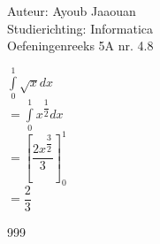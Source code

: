 \documentclass[a4paper]{article}
\newcommand{\dint}{\displaystyle\int}
\begin{document}
\noindent \large Auteur: Ayoub Jaaouan \\
\noindent \large Studierichting: Informatica\\
\noindent \large Oefeningenreeks 5A nr. 4.8\\

\medskip

\normalsize

$ \dint\limits_{0}^{1} \sqrt{x} dx $ \\

$= \dint\limits_{0}^{1} x^{\dfrac{1}{2}} dx $ \\


$= \left[ \dfrac{2x^{\dfrac{3}{2}}}{3} \right]_{0}^{1} $ \\

$= \dfrac{2}{3} $ \\




\begin{thebibliography}{999}
\end{thebibliography}
\end{document}
